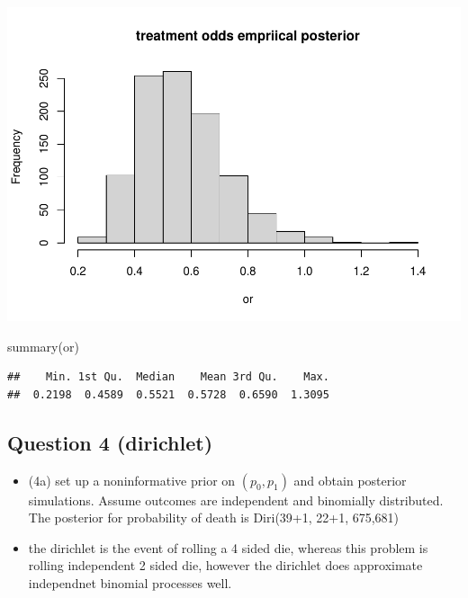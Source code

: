 \documentclass[
]{book}
\newenvironment{Shaded}{\begin{snugshade}}{\end{snugshade}}
\newcommand{\FunctionTok}[1]{\textcolor[rgb]{0.00,0.00,0.00}{#1}}
\newcommand{\NormalTok}[1]{#1}
\providecommand{\tightlist}{%
  \setlength{\itemsep}{0pt}\setlength{\parskip}{0pt}}
\theoremstyle{definition}
\theoremstyle{definition}
\theoremstyle{definition}
\theoremstyle{definition}
\theoremstyle{remark}
\begin{document}
\includegraphics{_main_files/figure-latex/unnamed-chunk-35-1.pdf}

\begin{Shaded}
\begin{Highlighting}[]
  \FunctionTok{summary}\NormalTok{(or)}
\end{Highlighting}
\end{Shaded}

\begin{verbatim}
##    Min. 1st Qu.  Median    Mean 3rd Qu.    Max. 
##  0.2198  0.4589  0.5521  0.5728  0.6590  1.3095
\end{verbatim}

\hypertarget{question-4-dirichlet}{%
\subsection*{Question 4 (dirichlet)}\label{question-4-dirichlet}}

\begin{itemize}
\tightlist
\item
  (4a) set up a noninformative prior on \((p_0,p_1)\) and obtain posterior simulations. Assume outcomes are independent and binomially distributed. The posterior for probability of death is Diri(39+1, 22+1, 675,681)
\item
  the dirichlet is the event of rolling a 4 sided die, whereas this problem is rolling independent 2 sided die, however the dirichlet does approximate independnet binomial processes well.
\end{itemize}
\end{document}
